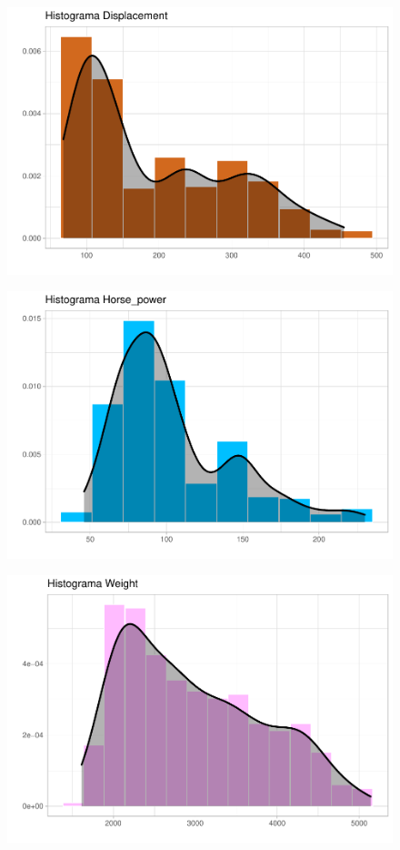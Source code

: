 \begin{figure}[H]\includegraphics[width=.9\linewidth]{img/EDA_files/figure-latex/unnamed-chunk-7-1}\caption{}\end{figure}
\begin{figure}[H]\includegraphics[width=.9\linewidth]{img/EDA_files/figure-latex/unnamed-chunk-7-2} \caption{}\end{figure}
\begin{figure}[H]\includegraphics[width=.9\linewidth]{img/EDA_files/figure-latex/unnamed-chunk-7-3} \caption{}\end{figure}
